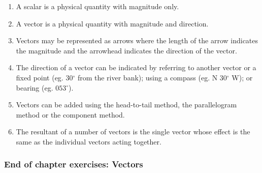         
        \label{m38819*id196910}\begin{enumerate}[noitemsep, label=\textbf{\arabic*}. ] 
            \label{m38819*uid78}\item A scalar is a physical quantity with magnitude only.
\label{m38819*uid79}\item A vector is a physical quantity with magnitude and direction.
\label{m38819*uid80}\item Vectors may be represented as arrows where the length of the arrow indicates the magnitude and the arrowhead indicates the direction of the vector.
\label{m38819*uid81}\item The direction of a vector can be indicated by referring to another vector or a fixed point (eg. \begin{math}30{}^{\circ }\end{math} from the river bank); using a compass (eg. N \begin{math}30{}^{\circ }\end{math} W); or bearing (eg. \begin{math}053{}^{\circ }\end{math}).
\label{m38819*uid82}\item Vectors can be added using the head-to-tail method, the parallelogram method or the component method.
\label{m38819*uid83}\item The resultant of a number of vectors is the single vector whose effect is the same as the individual vectors acting together.
\end{enumerate}
        
      
      \label{m38819*uid84}
            \subsubsection{ End of chapter exercises: Vectors}
            \nopagebreak
            

